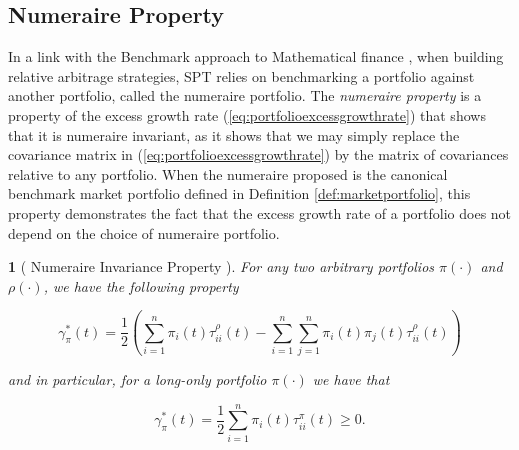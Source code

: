 \documentclass[british]{amsart} \usepackage{lmodern}
\numberwithin{equation}{section} \numberwithin{figure}{section}
\theoremstyle{plain} \newtheorem{thm}{\protect\theoremname}[section]
\theoremstyle{definition} \newtheorem{defn}[thm]{\protect\definitionname}
\theoremstyle{plain} \newtheorem{assumption}[thm]{\protect\assumptionname}
\theoremstyle{plain} \newtheorem{lem}[thm]{\protect\lemmaname}
\theoremstyle{plain} \newtheorem{prop}[thm]{\protect\propositionname}
\theoremstyle{remark} \newtheorem{rem}[thm]{\protect\remarkname}
\theoremstyle{plain} \newtheorem{cor}[thm]{\protect\corollaryname}
\begin{document}
\subsection{Numeraire Property}

In a link with the Benchmark approach to Mathematical finance \cite{platen2006},
when building relative arbitrage strategies, SPT relies on benchmarking a
portfolio against another portfolio, called the numeraire portfolio. The
\textit{numeraire property} is a property of the excess growth rate
(\ref{eq:portfolioexcessgrowthrate}) that shows that it is numeraire invariant,
as it shows that we may simply replace the covariance matrix in
(\ref{eq:portfolioexcessgrowthrate}) by the matrix of covariances relative to
any portfolio. When the numeraire proposed is the canonical benchmark market
portfolio defined in Definition \ref{def:marketportfolio}, this property
demonstrates the fact that the excess growth rate of a portfolio does not depend
on the choice of numeraire portfolio.

\begin{lem} [
    {\cite[Lemma 2.2.2]{vervuurt2015}}
    Numeraire Invariance Property
    ]
  For any two arbitrary portfolios $\pi(\cdot)$ and $\rho(\cdot)$, we have the
  following property 

  \begin{equation} 
    \label{eq:numeraireinvarianceproperty}
    \gamma_{\pi}^{*}(t) = \frac{1}{2} 
        \left(
          \sum_{i=1}^{n} \pi_{i}(t)\tau_{ii}^{\rho}(t) - 
          \sum_{i=1}^{n} \sum_{j=1}^{n} \pi_{i}(t)\pi_{j}(t)\tau_{ii}^{\rho}(t) 
        \right)
  \end{equation}

  and in particular, for a long-only portfolio $\pi(\cdot)$ we have that

  \begin{equation} 
    \label{eq:numeraireinvariancepropertylongonly}
    \gamma_{\pi}^{*}(t) = \frac{1}{2} 
          \sum_{i=1}^{n} \pi_{i}(t)\tau_{ii}^{\pi}(t) 
     \ge 0. 
  \end{equation}
 
\end{lem}

%
%
%
\end{document}
